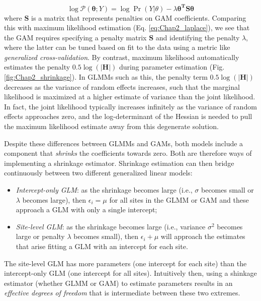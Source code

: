 \begin{equation}
    \log \mathcal{P}(\mathbf{\theta};Y) = \log \Pr(Y|\theta) - \lambda \mathbf{\theta^T S \theta} 
\end{equation}
where \(\mathbf{S}\) is a matrix that represents penalties on GAM coefficients.  Comparing this with maximum likelihood estimation (Eq. \ref{eq:Chap2_laplace}), we see that the GAM requires specifying a penalty matrix \(\mathbf{S}\) and identifying the penalty \(\lambda\), where the latter can be tuned based on fit to the data using a metric like \textit{generalized cross-validation}.  By contrast, maximum likelihood automatically estimates the penalty \(0.5\log(|\mathbf{H}|)\) during parameter estimation (Fig. \ref{fig:Chap2_shrinkage}). In GLMMs such as this, the penalty term \(0.5\log(|\mathbf{H}|)\) decreases as the variance of random effects increases, such that the marginal likelihood is maximized at a higher estimate of variance than the joint likelihood.  In fact, the joint likelihood typically increases infinitely as the variance of random effects approaches zero, and the log-determinant of the Hessian is needed to pull the maximum likelihood estimate away from this degenerate solution.  

Despite these differences between GLMMs and GAMs, both models include a component that \textit{shrinks} the coefficients towards zero.  Both are therefore ways of implementing a shrinkage estimator.  Shrinkage estimation can then bridge continuously between two different generalized linear models:
\begin{itemize}
    \item \textit{Intercept-only GLM}:  as the shrinkage becomes large (i.e., \(\sigma\) becomes small or \(\lambda\) becomes large), then \(\epsilon_i=\mu\) for all sites in the GLMM or GAM and these approach a GLM with only a single intercept;

    \item \textit{Site-level GLM}: as the shrinkage becomes large (i.e., variance \(\sigma^2\) becomes large or penalty \(\lambda\) becomes small), then \(\epsilon_i+\mu\) will approach the estimates that arise fitting a GLM with an intercept for each site.
\end{itemize}
The site-level GLM has more parameters (one intercept for each site) than the intercept-only GLM (one intercept for all sites).  Intuitively then, using a shinkage estimator (whether GLMM or GAM) to estimate parameters results in an \textit{effective degrees of freedom} that is intermediate between these two extremes. 


